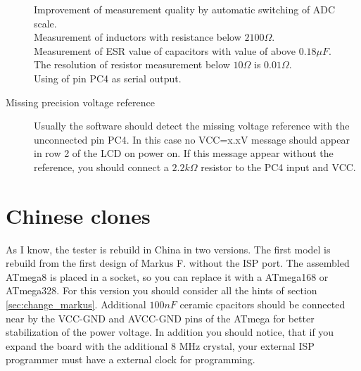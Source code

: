 \begin{description}
Improvement of measurement quality by automatic switching of ADC scale.\\
Measurement of inductors with resistance  below \(2100 \Omega\).\\
Measurement of ESR value of capacitors with value of above  \(0.18 \mu F\).\\
The resolution of resistor measurement below \(10 \Omega\) is \(0.01 \Omega\).\\
Using of pin PC4 as serial output.\\
\item[Missing precision voltage reference]
Usually the software should detect the missing voltage reference with the unconnected pin PC4.
In this case no VCC=x.xV message should appear in row 2 of the LCD on power on.
If this message appear without the reference, you should connect a \(2.2k \Omega\) resistor
to the PC4 input and VCC.


\end{description}

\section{Chinese clones}
As I know, the tester is rebuild in China in two versions.
The first model is rebuild from the first design of Markus F. without the ISP port.
The assembled ATmega8 is placed in a socket, so you can replace it with a ATmega168 or ATmega328.
For this version you should consider all the hints of section \ref{sec:change_markus}.
Additional \(100nF\) ceramic cpacitors should be connected near by the VCC-GND and AVCC-GND pins of
the ATmega for better stabilization of the power voltage.
In addition you should notice, that if you expand the board with the additional 8 MHz crystal,
your external ISP programmer must have a external clock for programming.\\

